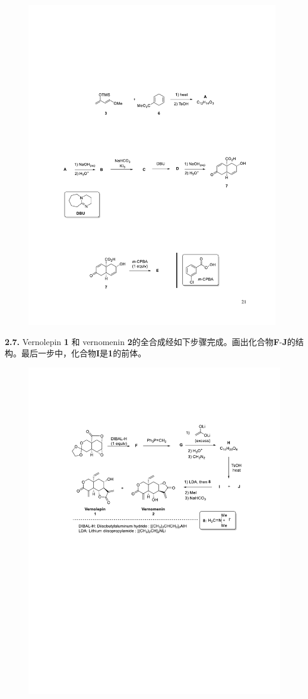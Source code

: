 \begin{figure}[h]
	\centering
	\includegraphics[width=11cm]{./pic/t2-8.pdf}
\end{figure}

\noindent\textbf{2.7.} Vernolepin \textbf{1} 和 vernomenin \textbf{2}的全合成经如下步骤完成。画出化合物\textbf{F}-\textbf{J}的结构。最后一步中，化合物\textbf{I}是\textbf{1}的前体。

\begin{figure}[h]
	\centering
	\includegraphics[width=13cm]{./pic/t2-9.pdf}
\end{figure}
